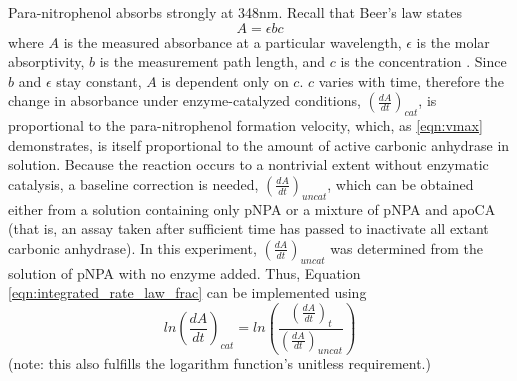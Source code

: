 Para-nitrophenol absorbs strongly at 348nm. Recall that Beer's law states
\begin{equation}\label{eqn:beers_law}
A=\epsilon b c
\end{equation}
where $A$ is the measured absorbance at a particular wavelength, $\epsilon$ is the molar absorptivity, $b$ is the measurement path length, and $c$ is the concentration \cite{bib:quantitative_chem_anal_beer_law}. Since $b$ and $\epsilon$ stay constant, $A$ is dependent only on $c$. $c$ varies with time, therefore the change in absorbance under enzyme-catalyzed conditions, $\left(\frac{dA}{dt}\right)_{cat}$, is proportional to the para-nitrophenol formation velocity, which, as \eqref{eqn:vmax} demonstrates, is itself proportional to the amount of active carbonic anhydrase in solution. Because the reaction occurs to a nontrivial extent without enzymatic catalysis, a baseline correction is needed, $(\frac{dA}{dt})_{uncat}$, which can be obtained either from a solution containing only pNPA or a mixture of pNPA and apoCA (that is, an assay taken after sufficient time has passed to inactivate all extant carbonic anhydrase). In this experiment, $(\frac{dA}{dt})_{uncat}$ was determined from the solution of pNPA with no enzyme added. Thus, Equation \eqref{eqn:integrated_rate_law_frac} can be implemented using
\begin{equation}\label{eqn:baseline_correction}
ln \left(\frac{dA}{dt}\right)_{cat} = ln \left( \frac{ \left (\frac{dA}{dt}\right)_{t} }{ \left (\frac{dA}{dt}\right)_{uncat} } \right)
\end{equation} 
(note: this also fulfills the logarithm function's unitless requirement.)